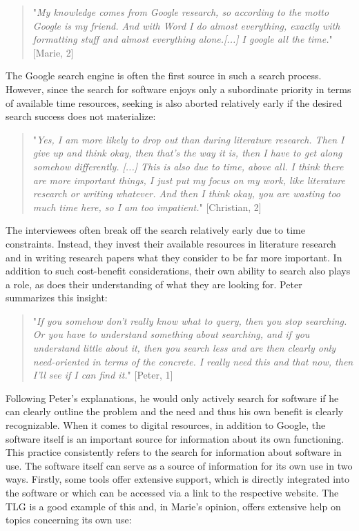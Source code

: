 \documentclass[12pt, a4paper, titlepage, oneside, abstract=true, toc=listof, toc=bibliography, BCOR=1cm]{scrreprt}
\begin{document}
{\begin{quotation}
"\textit{My knowledge comes from Google research, so according to the motto Google is my friend. And with Word I do almost everything, exactly with formatting stuff and almost everything alone.[...] I google all the time.}" [Marie, 2]
\end{quotation}

The Google search engine is often the first source in such a search process. However, since the search for software enjoys only a subordinate priority in terms of available time resources, seeking is also aborted relatively early if the desired search success does not materialize:

\begin{quotation}
"\textit{Yes, I am more likely to drop out than during literature research. Then I give up and think okay, then that's the way it is, then I have to get along somehow differently. [...] This is also due to time, above all. I think there are more important things, I just put my focus on my work, like literature research or writing whatever. And then I think okay, you are wasting too much time here, so I am too impatient.}" [Christian, 2]
\end{quotation}

The interviewees often break off the search relatively early due to time constraints. Instead, they invest their available resources in literature research and in writing research papers what they consider to be far more important. In addition to such cost-benefit considerations, their own ability to search also plays a role, as does their understanding of what they are looking for. Peter summarizes this insight:

\begin{quotation}
"\textit{If you somehow don't really know what to query, then you stop searching. Or you have to understand something about searching, and if you understand little about it, then you search less and are then clearly only need-oriented in terms of the concrete. I really need this and that now, then I'll see if I can find it.}" [Peter, 1]
\end{quotation}

Following Peter's explanations, he would only actively search for software if he can clearly outline the problem and the need and thus his own benefit is clearly recognizable.
When it comes to digital resources, in addition to Google, the software itself is an important source for information about its own functioning. This practice consistently refers to the search for information about software in use.
The software itself can serve as a source of information for its own use in two ways. Firstly, some tools offer extensive support, which is directly integrated into the software or which can be accessed via a link to the respective website. The TLG is a good example of this and, in Marie's opinion, offers extensive help on topics concerning its own use:

}
\end{document}
